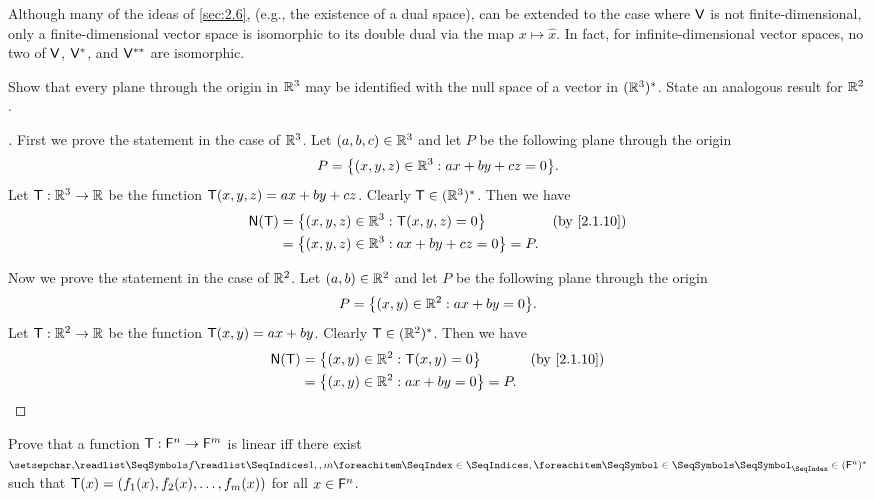 \begin{note}
	Although many of the ideas of \cref{sec:2.6}, (e.g., the existence of a dual space), can be extended to the case where \(\mathsf{V}\) is not finite-dimensional, only a finite-dimensional vector space is isomorphic to its double dual via the map \(x \mapsto \widehat{x}\).
	In fact, for infinite-dimensional vector spaces, no two of \(\mathsf{V}\), \(\mathsf{V}^*\), and \(\mathsf{V}^{**}\) are isomorphic.
\end{note}

\exercisesection

\setcounter{ex}{7}
\begin{ex}\label{ex:2.6.8}
	Show that every plane through the origin in \(\mathbb{R}^3\) may be identified with the null space of a vector in \((\mathbb{R}^3)^*\).
	State an analogous result for \(\mathbb{R}^2\).
\end{ex}

\begin{proof}[]
	First we prove the statement in the case of \(\mathbb{R}^3\).
	Let \((a, b, c) \in \mathbb{R}^3\) and let \(P\) be the following plane through the origin
	\[
		P = \set{(x, y, z) \in \R^3 : ax + by + cz = 0}.
	\]
	Let \(\mathsf{T} : \mathbb{R}^3 \to \mathbb{R}\) be the function \(\mathsf{T}(x, y, z) = ax + by + cz\).
	Clearly \(\mathsf{T} \in (\mathbb{R}^3)^*\).
	Then we have
	\begin{align*}
		\ns{\T} & = \set{(x, y, z) \in \R^3 : \T(x, y, z) = 0}       &  & \by{2.1.10} \\
		        & = \set{(x, y, z) \in \R^3 : ax + by + cz = 0} = P.
	\end{align*}

	Now we prove the statement in the case of \(\mathbb{R}^2\).
	Let \((a, b) \in \mathbb{R}^2\) and let \(P\) be the following plane through the origin
	\[
		P = \set{(x, y) \in \R^2 : ax + by = 0}.
	\]
	Let \(\mathsf{T} : \mathbb{R}^2 \to \mathbb{R}\) be the function \(\mathsf{T}(x, y) = ax + by\).
	Clearly \(\mathsf{T} \in (\mathbb{R}^2)^*\).
	Then we have
	\begin{align*}
		\ns{\T} & = \set{(x, y) \in \R^2 : \T(x, y) = 0}     &  & \by{2.1.10} \\
		        & = \set{(x, y) \in \R^2 : ax + by = 0} = P.
	\end{align*}
\end{proof}

\begin{ex}\label{ex:2.6.9}
	Prove that a function \(\mathsf{T} : \mathsf{F}^n \to \mathsf{F}^m\) is linear iff there exist \(\seq{f}{1,,m} \in (\vs{F}^n)^*\) such that \(\mathsf{T}(x) = (f_1(x), f_2(x), \dots, f_m(x))\) for all \(x \in \mathsf{F}^n\).
\end{ex}

